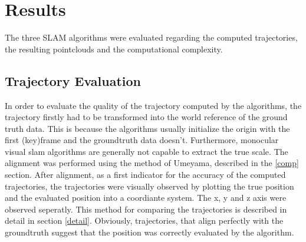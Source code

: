 \chapter{Results}

The three SLAM algorithms were evaluated regarding the computed trajectories, the resulting pointclouds and
the computational complexity. 

\section{Trajectory Evaluation}

	In order to evaluate the quality of the trajectory computed by the algorithms, the trajectory firstly had to be 
	transformed into the world reference of the ground truth data. This is because the algorithms usually initialize
	the origin with the first (key)frame and the groundtruth data doesn't. Furthermore, monocular visual slam algorithms 
	are generally not capable to extract the true scale. The alignment was performed using the method of Umeyama, described
	in the \ref{comp} section. 
	After alignment, as a first indicator for the accuracy of the computed trajectories, the trajectories were visually observed by 
	plotting the true position and the evaluated position into a coordiante system. The x, y and z axis were observed seperatly. This method 
    for comparing the trajectories is described in detail in section \ref{detail}. Obviously, trajectories, that align perfectly with the groundtruth
	suggest that the position was correctly evaluated by the algorithm. 
	

